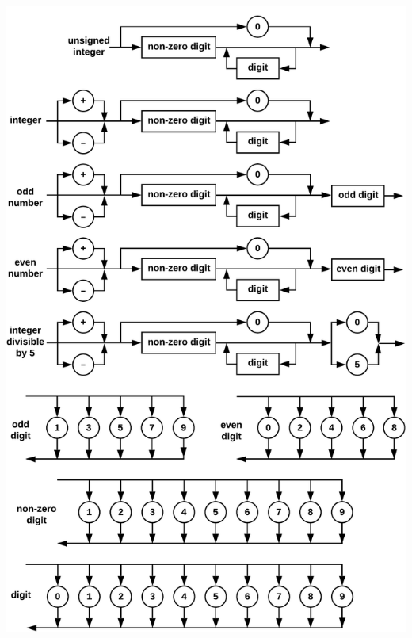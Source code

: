 \documentclass{article}
\begin{document}
		\includegraphics[width=\textwidth-2pt]{noleadingzeroescrop3}
		
			
	\ttfamily
\end{document}
